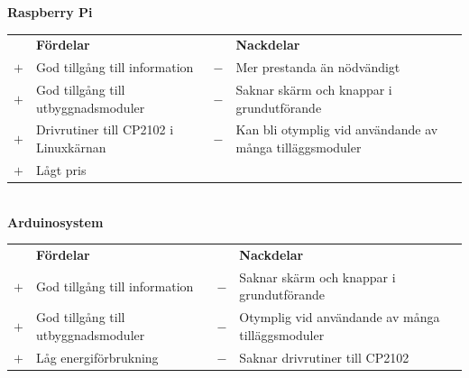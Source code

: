 \documentclass{article}
\begin{document}
                
            \noindent\textsf{\textbf{Raspberry Pi}}\\
            \begin{tabularx}{\textwidth}{@{}cXcX}
                & \textbf{Fördelar}     & & \textbf{Nackdelar} \\
                $+$ & God tillgång till information & 
                                        $-$ & Mer prestanda än nödvändigt \\
                $+$ & God tillgång till utbyggnads\-moduler & 
                                        $-$ & Saknar skärm och knappar i 
                                              grundutförande \\
                $+$ & Drivrutiner till CP2102 i Linuxkärnan &
                                        $-$ & Kan bli otymplig vid användande av   
                                              många tilläggsmoduler \\   
                $+$ & Lågt pris \\   
            \end{tabularx}\\
            
            \noindent\textsf{\textbf{Arduinosystem}} \\ 
            \begin{tabularx}{\textwidth}{@{}cXcX}
                & \textbf{Fördelar}     & & \textbf{Nackdelar} \\
                $+$ & God tillgång till information & 
                                        $-$ & Saknar skärm och knappar i 
                                            grundutförande \\
                $+$ & God tillgång till utbyggnads\-moduler & 
                                        $-$ & Otymplig vid användande av   
                                            många tilläggsmoduler \\
                $+$ & Låg energiförbrukning &
                                        $-$ & Saknar drivrutiner till CP2102 \\
            \end{tabularx} \\

        
\end{document}
